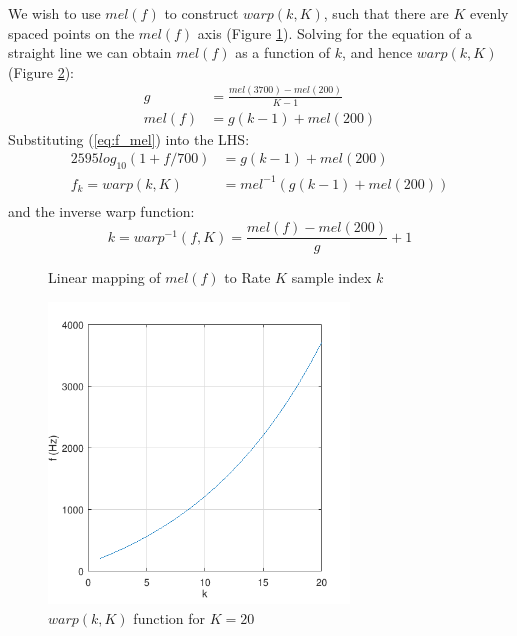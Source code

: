 \documentclass{article}
\begin{document}
We wish to use $mel(f)$ to construct $warp(k,K)$, such that there are $K$ evenly spaced points on the $mel(f)$ axis (Figure \ref{fig:mel_k}).  Solving for the equation of a straight line we can obtain $mel(f)$ as a function of $k$, and hence $warp(k,K)$ (Figure \ref{fig:warp_fhz_k}):
\begin{equation}
\label{eq:mel_k}
\begin{split}
g &= \frac{mel(3700)-mel(200)}{K-1} \\
mel(f) &= g(k-1) + mel(200)
\end{split}
\end{equation}
Substituting (\ref{eq:f_mel}) into the LHS:
\begin{equation}
\label{eq:warp}
\begin{split}
2595log_{10}(1+f/700) &= g(k-1) + mel(200) \\
f_k = warp(k,K) &= mel^{-1} ( g(k-1) + mel(200) ) \\
\end{split}
\end{equation}
and the inverse warp function:
\begin{equation} \label{warp_inv}
k = warp^{-1}(f,K) = \frac{mel(f)-mel(200)}{g} + 1
\end{equation}

\begin{figure}[h]
\caption{Linear mapping of $mel(f)$ to Rate $K$ sample index $k$}
\vspace{5mm}
\label{fig:mel_k}
\centering
{}
\end{figure}

\begin{figure}[h]
\caption{$warp(k,K)$ function for $K=20$}
\label{fig:warp_fhz_k}
\begin{center}
\includegraphics[width=8cm]{warp_fhz_k}
\end{center}
\end{figure}
\end{document}
